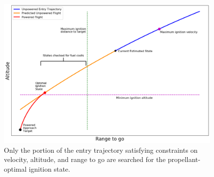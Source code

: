 \documentclass[letterpaper, preprint, paper,11pt]{AAS}
\begin{document}
\begin{figure}[h!]
	\centering
	\includegraphics[width=1\textwidth]{H_Vs_S_625} 
	\caption{Only the portion of the entry trajectory satisfying constraints on velocity, altitude, and range to go are searched for the propellant-optimal ignition state.}
	\label{fig_ignition}
\end{figure}

\end{document}
